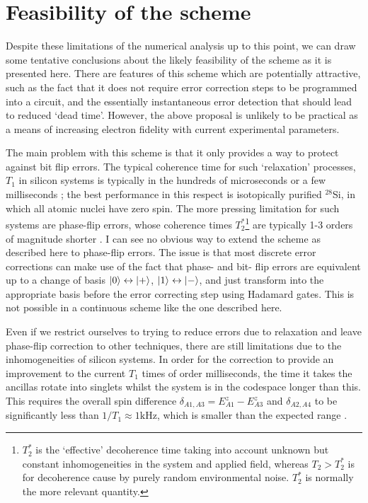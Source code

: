 \documentclass{report}
\begin{document}
\section{Feasibility of the scheme}\label{sec:feasibility}
Despite these limitations of the numerical analysis up to this point, we can draw some tentative conclusions about the likely feasibility of the scheme as it is presented here. There are features of this scheme which are potentially attractive, such as the fact that it does not require error correction steps to be programmed into a circuit, and the essentially instantaneous error detection that should lead to reduced `dead time'. However, the above proposal is unlikely to be practical as a means of increasing electron fidelity with current experimental parameters. 

The main problem with this scheme is that it only provides a way to protect against bit flip errors. The typical coherence time for such `relaxation' processes, $T_1$ in silicon systems is typically in the hundreds of microseconds or a few milliseconds \cite{Loss2022}\cite{Zwerver2022}; the best performance in this respect is isotopically purified $^{28}$Si, in which all atomic nuclei have zero spin. The more pressing limitation for such systems are phase-flip errors, whose coherence times $T_2^*$\footnote{ $T_2^*$ is the `effective' decoherence time taking into account unknown but constant inhomogeneities in the system and applied field, whereas $T_2 > T_2^*$ is for decoherence cause by purely random environmental noise. $T_2^*$ is normally the more relevant quantity.} are typically 1-3 orders of magnitude shorter \cite{Loss2022}. I can see no obvious way to extend the scheme as described here to phase-flip errors. The issue is that most discrete error corrections can make use of the fact that phase- and bit- flip errors are equivalent up to a change of basis $\ket{0} \leftrightarrow \ket{+}$, $\ket{1}\leftrightarrow\ket{-}$, and just transform into the appropriate basis before the error correcting step using Hadamard gates. This is not possible in a continuous scheme like the one described here.

Even if we restrict ourselves to trying to reduce errors due to relaxation and leave phase-flip correction to other techniques, there are still limitations due to the inhomogeneities of silicon systems. In order for the correction to provide an improvement to the current $T_1$ times of order milliseconds, the time it takes the ancillas rotate into singlets whilst the system is in the codespace longer than this. This requires the overall spin difference $\delta_{A1, A3} = E_{A1}^z - E_{A3}^z$ and $\delta_{A2, A4}$ to be significantly less than $1/T_1 \approx 1\unit{\kilo\hertz}$, which is smaller than the expected range \cite{Hwang2017}.
\end{document}
